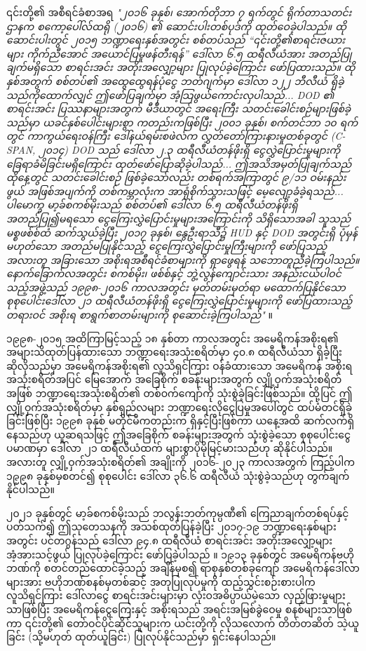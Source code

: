 \documentclass[10pt,twocolumn,letterpaper]{article}
\begin{document}
၎င်းတို့၏ အစီရင်ခံစာအရ \textit{"၂၀၁၆ ခုနှစ်၊ အောက်တိုဘာ ၇ ရက်တွင် ရိုက်တာသတင်းဌာနက စကော့ပေါ်လ်ထရို (၂၀၁၆) ၏ ဆောင်းပါးတစ်ပုဒ်ကို ထုတ်ဝေခဲ့ပါသည်။ ထိုဆောင်းပါးတွင် ၂၀၁၅ ဘဏ္ဍာရေးနှစ်အတွင်း စစ်တပ်သည် “၎င်းတို့၏စာရင်းဇယားများ ကိုက်ညီအောင် အယောင်ပြမှုဖန်တီးရန်” ဒေါ်လာ ၆.၅ ထရီလီယံအား အတည်ပြုချက်မရှိသော စာရင်းအင်း အတိုးအလျှော့များ ပြုလုပ်ခဲ့ကြောင်း ဖော်ပြထားသည်။ ထိုနှစ်အတွက် စစ်တပ်၏ အထွေထွေရန်ပုံငွေ ဘတ်ဂျက်မှာ ဒေါ်လာ ၁၂၂ ဘီလီယံ ရှိခဲ့သည်ကိုထောက်လျှင် ဤဖော်ပြချက်မှာ အံ့သြဖွယ်ကောင်းလှပါသည်... DOD ၏ စာရင်းအင်း ပြဿနာများအတွက် မီဒီယာတွင် အရေးကြီး သတင်းခေါင်းစဉ်များဖြစ်ခဲ့သည်မှာ ယခင်နှစ်ပေါင်းများစွာ ကတည်းကဖြစ်ပြီး ၂၀၀၁ ခုနှစ်၊ စက်တင်ဘာ ၁၀ ရက်တွင် ကာကွယ်ရေးဝန်ကြီး ဒေါ်နယ်ရမ်းစဖဲလ်က လွှတ်တော်ကြားနားမှုတစ်ခုတွင် (C-SPAN, ၂၀၁၄) DOD သည် ဒေါ်လာ ၂.၃ ထရီလီယံတန်ဖိုးရှိ ငွေလွှဲပြောင်းမှုများကို ခြေရာခံမိခြင်းမရှိကြောင်း ထုတ်ဖော်ပြောဆိုခဲ့ပါသည်... ဤအသိအမှတ်ပြုချက်သည် ထိုနေ့တွင် သတင်းခေါင်းစဉ် ဖြစ်ခဲ့သော်လည်း တစ်ရက်အကြာတွင် ၉/၁၁ ဝမ်းနည်းဖွယ် အဖြစ်အပျက်ကို တစ်ကမ္ဘာလုံးက အာရုံစိုက်သွားသဖြင့် မေ့လျော့ခံခဲ့ရသည်... ပါမောက္ခ မာ့ခ်စကစ်မိုးသည် စစ်တပ်၏ ဒေါ်လာ ၆.၅ ထရီလီယံတန်ဖိုးရှိ အတည်ပြု၍မရသော ငွေကြေးလွှဲပြောင်းမှုများအကြောင်းကို သိရှိသောအခါ သူသည် မစ္စဖစ်စ်ထံ ဆက်သွယ်ခဲ့ပြီး ၂၀၁၇ ခုနှစ်၊ နွေဦးရာသီ၌ HUD နှင့် DOD အတွင်းရှိ ပုံမှန်မဟုတ်သော အတည်မပြုနိုင်သည့် ငွေကြေးလွှဲပြောင်းမှုကြီးများကို ဖော်ပြသည့် အလားတူ အခြားသော အစိုးရအစီရင်ခံစာများကို ရှာဖွေရန် သဘောတူညီခဲ့ကြပါသည်။ နောက်ခြောက်လအတွင်း စကစ်မိုး၊ ဖစ်စ်နှင့် ဘွဲ့လွန်ကျောင်းသား အနည်းငယ်ပါဝင်သည့်အဖွဲ့သည် ၁၉၉၈-၂၀၁၆ ကာလအတွင်း မှတ်တမ်းမှတ်ရာ မထောက်ပြနိုင်သော စုစုပေါင်းဒေါ်လာ ၂၁ ထရီလီယံတန်ဖိုးရှိ ငွေကြေးလွှဲပြောင်းမှုများကို ဖော်ပြထားသည့် တရားဝင် အစိုးရ စာရွက်စာတမ်းများကို စုဆောင်းခဲ့ကြပါသည်"} \cite{12}။

၁၉၉၈-၂၀၁၅ အထိကြာမြင့်သည့် ၁၈ နှစ်တာ ကာလအတွင်း အမေရိကန်အစိုးရ၏ အများသိထုတ်ပြန်ထားသော ဘဏ္ဍာရေးအသုံးစရိတ်မှာ ၄၀.၈ ထရီလီယံသာ ရှိခဲ့ပြီး \cite{15} ဆိုလိုသည်မှာ အမေရိကန်အစိုးရ၏ လူသိရှင်ကြား ဝန်ခံထားသော အမေရိကန် အစိုးရ အသုံးစရိတ်အပြင် မြေအောက် အခြေစိုက် စခန်းများအတွက် လျှို့ဝှက်အသုံးစရိတ်အဖြစ် ဘဏ္ဍာရေးအသုံးစရိတ်၏ တစ်ဝက်ကျော်ကို သုံးစွဲခဲ့ခြင်းဖြစ်သည်။ ထို့ပြင် ဤလျှို့ဝှက်အသုံးစရိတ်မှာ နှစ်ရှည်လများ ဘဏ္ဍာရေးလိုငွေပြမှုအပေါ်တွင် ထပ်မံတင်ရှိခဲ့ခြင်းဖြစ်ပြီး ၁၉၉၈ ခုနှစ် မတိုင်မီကတည်းက ရှိနှင့်ပြီးဖြစ်ကာ ယနေ့အထိ ဆက်လက်ရှိနေသည်ဟု ယူဆရသဖြင့် ဤအခြေစိုက် စခန်းများအတွက် သုံးစွဲခဲ့သော စုစုပေါင်းငွေပမာဏမှာ ဒေါ်လာ ၂၁ ထရီလီယံထက် များစွာပိုမိုမြင့်မားသည်ဟု ဆိုနိုင်ပါသည်။ အလားတူ လျှို့ဝှက်အသုံးစရိတ်၏ အချိုးကို ၂၀၁၆-၂၀၂၃ ကာလအတွက် ကြည့်ပါက ၁၉၉၈ ခုနှစ်မှစတင်၍ စုစုပေါင်း ဒေါ်လာ ၃၆.၆ ထရီလီယံ သုံးစွဲခဲ့သည်ဟု တွက်ချက်နိုင်ပါသည်။

၂၀၂၁ ခုနှစ်တွင် မာ့ခ်စကစ်မိုးသည် ဘလွန်းဘတ်ကုမ္ပဏီ၏ ကြေညာချက်တစ်ရပ်နှင့်ပတ်သက်၍ ဤသုတေသနကို အသစ်ထုတ်ပြန်ခဲ့ပြီး ၂၀၁၇-၁၉ ဘဏ္ဍာရေးနှစ်များအတွင်း ပင်တဂွန်သည် ဒေါ်လာ ၉၄.၈ ထရီလီယံ စာရင်းအင်း အတိုးအလျှော့များ အံ့အားသင့်ဖွယ် ပြုလုပ်ခဲ့ကြောင်း ဖော်ပြခဲ့ပါသည် \cite{17,18}။ ၁၉၁၃ ခုနှစ်တွင် အမေရိကန်ဗဟိုဘဏ်ကို စတင်တည်ထောင်ခဲ့သည့် အချိန်မှစ၍ ရာစုနှစ်တစ်ခုကျော် အမေရိကန်ဒေါ်လာများအား ဗဟိုဘဏ်စနစ်မှတစ်ဆင့် အတုပြုလုပ်မှုကို ထည့်သွင်းစဉ်းစားပါက \cite{37} လူသိရှင်ကြား ဒေါ်လာငွေ စာရင်းအင်းများမှာ လုံးဝအဓိပ္ပာယ်မဲ့သော လှည့်ဖြားမှုများသာဖြစ်ပြီး အမေရိကန်ငွေကြေးနှင့် အစိုးရသည် အရင်းအမြစ်ခွဲဝေမှု စနစ်များသာဖြစ်ကာ ၎င်းတို့၏ တော်ဝင်ပိုင်ဆိုင်သူများက ယင်းတို့ကို လိုသလောက် တိတ်တဆိတ် သဲ့ယူခြင်း (သို့မဟုတ် ထုတ်ယူခြင်း) ပြုလုပ်နိုင်သည်မှာ ရှင်းနေပါသည်။
\end{document}
